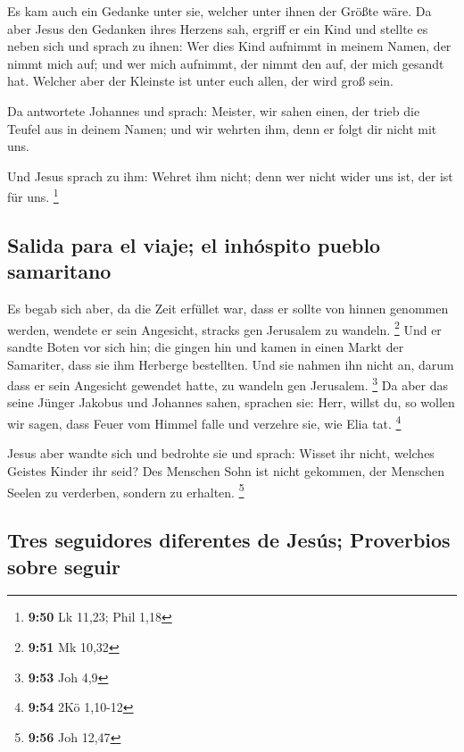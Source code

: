  Es kam auch ein Gedanke unter sie, welcher unter ihnen
der Größte wäre.  Da aber Jesus den Gedanken ihres
Herzens sah, ergriff er ein Kind und stellte es neben sich
 und sprach zu ihnen: Wer dies Kind aufnimmt in meinem
Namen, der nimmt mich auf; und wer mich aufnimmt, der nimmt den auf, der
mich gesandt hat. Welcher aber der Kleinste ist unter euch allen, der
wird groß sein.

 Da antwortete Johannes und sprach: Meister, wir sahen
einen, der trieb die Teufel aus in deinem Namen; und wir wehrten ihm,
denn er folgt dir nicht mit uns.

 Und Jesus sprach zu ihm: Wehret ihm nicht; denn wer
nicht wider uns ist, der ist für uns. \footnote{\textbf{9:50} Lk 11,23;
  Phil 1,18}

\hypertarget{salida-para-el-viaje-el-inhuxf3spito-pueblo-samaritano}{%
\subsection{Salida para el viaje; el inhóspito pueblo
samaritano}\label{salida-para-el-viaje-el-inhuxf3spito-pueblo-samaritano}}

 Es begab sich aber, da die Zeit erfüllet war, dass er
sollte von hinnen genommen werden, wendete er sein Angesicht, stracks
gen Jerusalem zu wandeln. \footnote{\textbf{9:51} Mk 10,32}
 Und er sandte Boten vor sich hin; die gingen hin und
kamen in einen Markt der Samariter, dass sie ihm Herberge bestellten.
 Und sie nahmen ihn nicht an, darum dass er sein
Angesicht gewendet hatte, zu wandeln gen Jerusalem. \footnote{\textbf{9:53}
  Joh 4,9}  Da aber das seine Jünger Jakobus und Johannes
sahen, sprachen sie: Herr, willst du, so wollen wir sagen, dass Feuer
vom Himmel falle und verzehre sie, wie Elia tat. \footnote{\textbf{9:54}
  2Kö 1,10-12}

 Jesus aber wandte sich und bedrohte sie und sprach:
Wisset ihr nicht, welches Geistes Kinder ihr seid?  Des
Menschen Sohn ist nicht gekommen, der Menschen Seelen zu verderben,
sondern zu erhalten. \footnote{\textbf{9:56} Joh 12,47}

\hypertarget{tres-seguidores-diferentes-de-jesuxfas-proverbios-sobre-seguir}{%
\subsection{Tres seguidores diferentes de Jesús; Proverbios sobre
seguir}\label{tres-seguidores-diferentes-de-jesuxfas-proverbios-sobre-seguir}}

